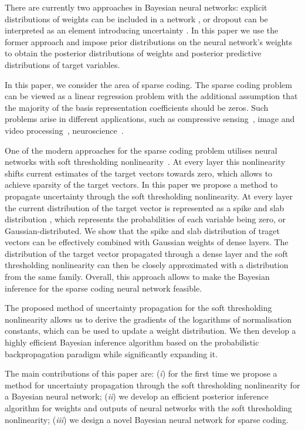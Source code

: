 \documentclass{article}
\begin{document}
There are currently two approaches in Bayesian neural networks: explicit distributions of weights can be included in a network \citep{hernandez2015probabilistic, ranganath2015deep}, or dropout can be interpreted as an element introducing uncertainty \citep{gal2016dropout}. In this paper we use the former approach and impose prior distributions on the neural network's weights to obtain the posterior distributions of weights and posterior predictive distributions of target variables.

In this paper, we consider the area of sparse coding. The sparse coding problem can be viewed as a linear regression problem with the additional assumption that the majority of the basis representation coefficients should be zeros. Such problems arise in different applications, such as compressive sensing~\citep{candes2008introduction}, image and video processing~\citep{mairal2014sparse, wang2015deep}, neuroscience~\citep{baillet1997bayesian, jas2017learning}.

One of the modern approaches for the sparse coding problem utilises neural networks with soft thresholding nonlinearity~\citep{gregor2010learning, sprechmann2015learning}. At every layer this nonlinearity shifts current estimates of the target vectors towards zero, which allows to achieve sparsity of the target vectors. In this paper we propose a method to propagate uncertainty through the soft thresholding nonlinearity. At every layer the current distribution of the target vector is represented as a spike and slab distribution \citep{mitchell1988bayesian}, which represents the probabilities of each variable being zero, or Gaussian-distributed. We show that the spike and slab distribution of traget vectors can be effectively combined with Gaussian weights of dense layers. The distribution of the target vector propagated through a dense layer and the soft thresholding nonlinearity can then be closely approximated with a distribution from the same family. Overall, this approach allows to make the Bayesian inference for the sparse coding neural network feasible.

The proposed method of uncertainty propagation for the soft thresholding nonlinearity allows us to derive the gradients of the logarithms of normalisation constants, which can be used to update a weight distribution. We then develop a highly efficient Bayesian inference algorithm based on the probabilistic backpropagation paradigm while significantly expanding it.

The main contributions of this paper are: (\textit{i}) for the first time we propose a method for uncertainty propagation through the soft thresholding nonlinearity for a Bayesian neural network; (\textit{ii}) we develop an efficient posterior inference algorithm for weights and outputs of neural networks with the soft thresholding nonlinearity; (\textit{iii}) we design a novel Bayesian neural network for sparse coding.
\end{document}
